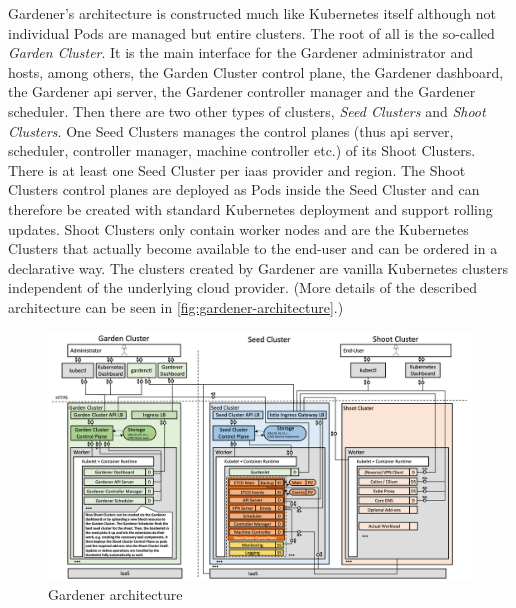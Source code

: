 Gardener's architecture is constructed much like Kubernetes itself although not individual Pods are managed but entire clusters.
The root of all is the so-called \emph{Garden Cluster}.
It is the main interface for the Gardener administrator and hosts, among others, the Garden Cluster control plane, the Gardener dashboard, the Gardener \ac{api} server, the Gardener controller manager and the Gardener scheduler.
Then there are two other types of clusters, \emph{Seed Clusters} and \emph{Shoot Clusters}.
One Seed Clusters manages the control planes (thus \ac{api} server, scheduler, controller manager, machine controller etc.) of its Shoot Clusters.
There is at least one Seed Cluster per \ac{iaas} provider and region.
The Shoot Clusters control planes are deployed as Pods inside the Seed Cluster and can therefore be created with standard Kubernetes deployment and support rolling updates.
Shoot Clusters only contain worker nodes and are the Kubernetes Clusters that actually become available to the end-user and can be ordered in a declarative way.
The clusters created by Gardener are vanilla Kubernetes clusters independent of the underlying cloud provider. \cite{gardener.blog2, wasistgardener}
(More details of the described architecture can be seen in \autoref{fig:gardener-architecture}.)

\begin{figure}[H]
    \centering
    \includegraphics[width=\textwidth]{Bilder/gardener-architecture-detailed.png}
    \caption{Gardener architecture \cite{gardener.architecture}}
    \label{fig:gardener-architecture}
\end{figure}

    
